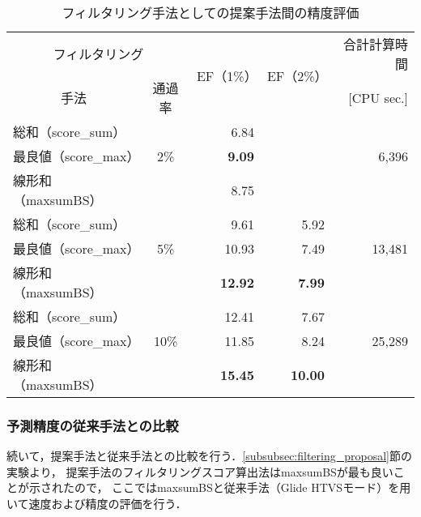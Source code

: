 \begin{table}[htb] \centering
	\caption{フィルタリング手法としての提案手法間の精度評価}
	\label{table:filtering_proposal}
	\begin{tabular}{lc|rr|r}
	\hline
	\multicolumn{2}{c|}{フィルタリング}	&\multirow{2}{*}{EF（1\%）}	&\multirow{2}{*}{EF（2\%）}	&合計計算時間	\\
	\multicolumn{1}{c}{手法}	&通過率	&						&						&[CPU sec.]		\\ \hline
	総和（score\_sum）		&		&6.84					&\textendash				&				\\
	最良値（score\_max）	&2\%	&\textbf{9.09}				&\textendash				&6,396			\\
	線形和（maxsumBS）	&		&8.75					&\textendash				&				\\ \hline
	総和（score\_sum）		&		&9.61					&5.92					&				\\
	最良値（score\_max）	&5\%	&10.93					&7.49					&13,481			\\
	線形和（maxsumBS）	&		&\textbf{12.92}			&\textbf{7.99}				&				\\ \hline
	総和（score\_sum）		&		&12.41					&7.67					&				\\
	最良値（score\_max）	&10\%	&11.85					&8.24					&25,289			\\
	線形和（maxsumBS）	&		&\textbf{15.45}			&\textbf{10.00}			&				\\ \hline
	\end{tabular}
\end{table}


\subsubsection{予測精度の従来手法との比較}\label{subsubsec:filtering_comparison}
続いて，提案手法と従来手法との比較を行う．\ref{subsubsec:filtering_proposal}節の実験より，
提案手法のフィルタリングスコア算出法はmaxsumBSが最も良いことが示されたので，
ここではmaxsumBSと従来手法（Glide HTVSモード）を用いて速度および精度の評価を行う．

